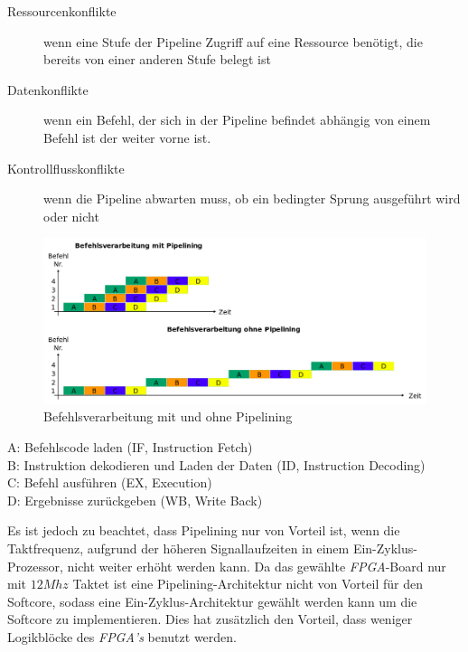                \begin{description}
                    \item[Ressourcenkonflikte] wenn eine Stufe der Pipeline Zugriff auf eine Ressource benötigt, die bereits von einer anderen Stufe belegt ist 
                    \item[Datenkonflikte] wenn ein Befehl, der sich in der Pipeline befindet abhängig von einem Befehl ist der weiter vorne ist.
                    \item[Kontrollflusskonflikte] wenn die Pipeline abwarten muss, ob ein bedingter Sprung ausgeführt wird oder nicht
                \end{description}
                \begin{figure}[H]
                    \centering
                    \includegraphics[scale=0.375]{img/pipelining.png}
                    \caption[Befehlsverarbeitung mit und ohne Pipelining]{Befehlsverarbeitung mit und ohne Pipelining \cite{pipelining} }
                    \label{fig:pipelining}
                \end{figure}
                \begin{description}
                    \item[A: Befehlscode laden (IF, Instruction Fetch)] 
                    \item[B: Instruktion dekodieren und Laden der Daten (ID, Instruction Decoding)] 
                    \item[C: Befehl ausführen (EX, Execution)] 
                    \item[D: Ergebnisse zurückgeben (WB, Write Back)] 
                \end{description}
                Es ist jedoch zu beachtet, dass Pipelining nur von Vorteil ist, wenn die Taktfrequenz, aufgrund der höheren Signallaufzeiten
                in einem Ein-Zyklus-Prozessor, nicht weiter erhöht werden kann.
                Da das gewählte \textit{FPGA}-Board nur mit $12 Mhz$ Taktet ist eine Pipelining-Architektur
                nicht von Vorteil für den Softcore, sodass eine Ein-Zyklus-Architektur gewählt werden kann um die Softcore zu implementieren.
                Dies hat zusätzlich den Vorteil, dass weniger Logikblöcke des \textit{FPGA's} benutzt werden.



